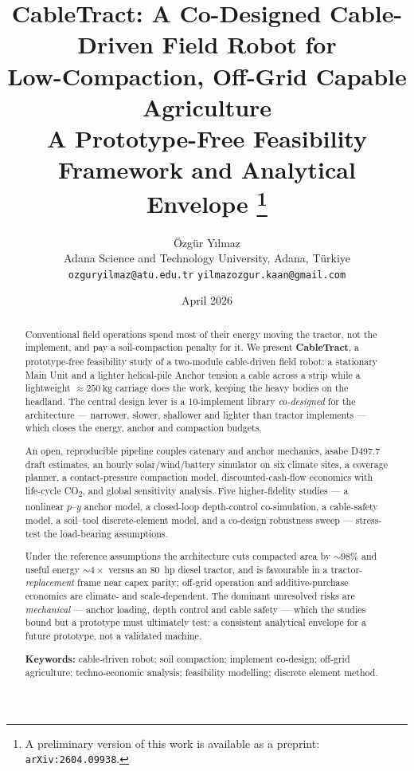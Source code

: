 \documentclass[11pt,a4paper]{article}
\title{\textbf{CableTract: A Co-Designed Cable-Driven Field Robot for\\
Low-Compaction, Off-Grid Capable Agriculture}\\[0.4em]
\large A Prototype-Free Feasibility Framework and Analytical Envelope%
\thanks{A preliminary version of this work is available as a preprint: \texttt{arXiv:2604.09938}.}}
\author{Özgür Yılmaz\\[0.3em]
\normalsize Adana Science and Technology University, Adana, Türkiye\\[0.15em]
\normalsize \texttt{ozguryilmaz@atu.edu.tr} \quad \texttt{yilmazozgur.kaan@gmail.com}}
\date{April 2026}
\begin{document}
\maketitle

\begin{abstract}
\noindent
Conventional field operations spend most of their energy moving the tractor, not the implement, and pay a soil-compaction penalty for it. We present \textbf{CableTract}, a prototype-free feasibility study of a two-module cable-driven field robot: a stationary Main Unit and a lighter helical-pile Anchor tension a cable across a strip while a lightweight ${\approx}\SI{250}{\kilogram}$ carriage does the work, keeping the heavy bodies on the headland. The central design lever is a 10-implement library \emph{co-designed} for the architecture --- narrower, slower, shallower and lighter than tractor implements --- which closes the energy, anchor and compaction budgets.

\medskip
An open, reproducible pipeline couples catenary and anchor mechanics, \gls{asabe} D497.7 draft estimates, an hourly solar/wind/battery simulator on six climate sites, a coverage planner, a contact-pressure compaction model, discounted-cash-flow economics with life-cycle CO\textsubscript{2}, and global sensitivity analysis. Five higher-fidelity studies --- a nonlinear $p$--$y$ anchor model, a closed-loop depth-control co-simulation, a cable-safety model, a soil--tool discrete-element model, and a co-design robustness sweep --- stress-test the load-bearing assumptions.

\medskip
Under the reference assumptions the architecture cuts compacted area by ${\sim}98\%$ and useful energy ${\sim}4\times$ versus an \SI{80}{hp} diesel tractor, and is favourable in a tractor-\emph{replacement} frame near capex parity; off-grid operation and additive-purchase economics are climate- and scale-dependent. The dominant unresolved risks are \emph{mechanical} --- anchor loading, depth control and cable safety --- which the studies bound but a prototype must ultimately test: a consistent analytical envelope for a future prototype, not a validated machine.

\medskip
\noindent\textbf{Keywords:} cable-driven robot; soil compaction; implement co-design; off-grid agriculture; techno-economic analysis; feasibility modelling; discrete element method.
\end{abstract}

\tableofcontents

\glsresetall
\end{document}
